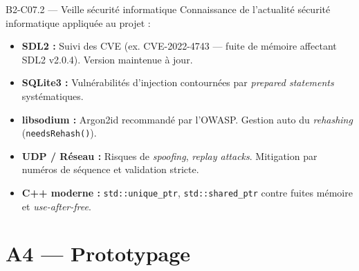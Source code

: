 \documentclass[aspectratio=169,10pt]{beamer}
\begin{document}
\begin{frame}{B2-C07.2 — Veille sécurité informatique}
\footnotesize
Connaissance de l'actualité sécurité informatique appliquée au projet :

\begin{itemize}\setlength\itemsep{2pt}
  \item \textbf{SDL2 :} Suivi des CVE (ex. CVE-2022-4743 — fuite de mémoire affectant SDL2 v2.0.4). Version maintenue à jour.
  \item \textbf{SQLite3 :} Vulnérabilités d'injection contournées par \textit{prepared statements} systématiques.
  \item \textbf{libsodium :} Argon2id recommandé par l'OWASP. Gestion auto du \textit{rehashing} (\texttt{needsRehash()}).
  \item \textbf{UDP / Réseau :} Risques de \textit{spoofing}, \textit{replay attacks}. Mitigation par numéros de séquence et validation stricte.
  \item \textbf{C++ moderne :} \texttt{std::unique\_ptr}, \texttt{std::shared\_ptr} contre fuites mémoire et \textit{use-after-free}.
\end{itemize}


\end{frame}

\section{A4 — Prototypage}
\end{document}
